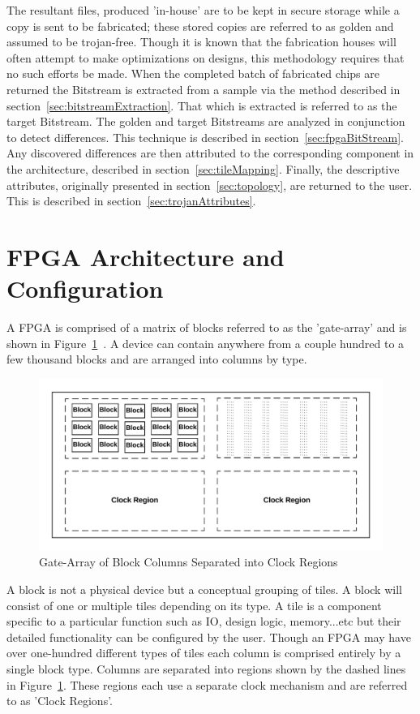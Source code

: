 The resultant files, produced 'in-house' are to be kept in secure storage while a copy is sent to be fabricated; these stored copies are referred to as \gls{golden} and assumed to be trojan-free.
Though it is known that the fabrication houses will often attempt to make optimizations on designs, this methodology requires that no such efforts be made.
When the completed batch of fabricated chips are returned the \gls{Bitstream} is extracted from a sample via the method described in section~\ref{sec:bitstreamExtraction}. 
That which is extracted is referred to as the \gls{target} \gls{Bitstream}.
The \gls{golden} and \gls{target} \gls{Bitstream}s are analyzed in conjunction to detect differences.
This technique is described in section~\ref{sec:fpgaBitStream}.
Any discovered differences are then attributed to the corresponding component in the architecture, described in section~\ref{sec:tileMapping}.
Finally, the descriptive attributes, originally presented in section~\ref{sec:topology}, are returned to the user.
This is described in section~\ref{sec:trojanAttributes}. 


\section{FPGA Architecture and Configuration} \label{sec:architectureAndConfig}
A \Xilinx \acrfull{FPGA} is comprised of a matrix of blocks referred to as the 'gate-array' and is shown in Figure~\ref{fig:FPGA}~\cite{xilnxDevManual}.
A device can contain anywhere from a couple hundred to a few thousand blocks and are arranged into columns by type.
\begin{figure}[h]
	\centering
	\includegraphics[width=1\linewidth]{figures/FPGA}
	\caption[Gate-Array of Block Columns Separated into Clock Regions]{Gate-Array of Block Columns Separated into Clock Regions}
	\label{fig:FPGA}
\end{figure}
A block is not a physical device but a conceptual grouping of tiles.
A block will consist of one or multiple tiles depending on its type.
A tile is a component specific to a particular function such as \acrfull{IO}, design logic, memory...etc but their detailed functionality can be configured by the user.
Though an \acrshort{FPGA} may have over one-hundred different types of tiles each column is comprised entirely by a single block type.
Columns are separated into regions shown by the dashed lines in Figure~\ref{fig:FPGA}.
These regions each use a separate clock mechanism and are referred to as 'Clock Regions'.


